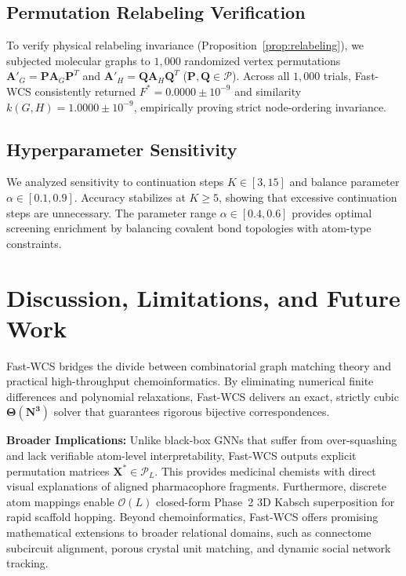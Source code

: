 \documentclass[conference]{IEEEtran}
\begin{document}
\subsection{Permutation Relabeling Verification}

To verify physical relabeling invariance (Proposition~\ref{prop:relabeling}), we subjected molecular graphs to $1,000$ randomized vertex permutations $\mathbf{A}'_G = \mathbf{P}\mathbf{A}_G\mathbf{P}^T$ and $\mathbf{A}'_H = \mathbf{Q}\mathbf{A}_H\mathbf{Q}^T$ ($\mathbf{P}, \mathbf{Q} \in \mathcal{P}$). Across all $1,000$ trials, Fast-WCS consistently returned $F^* = 0.0000 \pm 10^{-9}$ and similarity $k(G, H) = 1.0000 \pm 10^{-9}$, empirically proving strict node-ordering invariance.

\subsection{Hyperparameter Sensitivity}

We analyzed sensitivity to continuation steps $K \in [3, 15]$ and balance parameter $\alpha \in [0.1, 0.9]$. Accuracy stabilizes at $K \geq 5$, showing that excessive continuation steps are unnecessary. The parameter range $\alpha \in [0.4, 0.6]$ provides optimal screening enrichment by balancing covalent bond topologies with atom-type constraints.


\section{Discussion, Limitations, and Future Work}
\label{sec:discussion}

Fast-WCS bridges the divide between combinatorial graph matching theory and practical high-throughput chemoinformatics. By eliminating numerical finite differences and polynomial relaxations, Fast-WCS delivers an exact, strictly cubic $\mathbf{\Theta(N^3)}$ solver that guarantees rigorous bijective correspondences.

\noindent\textbf{Broader Implications:} Unlike black-box GNNs that suffer from over-squashing and lack verifiable atom-level interpretability, Fast-WCS outputs explicit permutation matrices $\mathbf{X}^* \in \mathcal{P}_L$. This provides medicinal chemists with direct visual explanations of aligned pharmacophore fragments. Furthermore, discrete atom mappings enable $\mathcal{O}(L)$ closed-form Phase~2 3D Kabsch superposition for rapid scaffold hopping. Beyond chemoinformatics, Fast-WCS offers promising mathematical extensions to broader relational domains, such as connectome subcircuit alignment, porous crystal unit matching, and dynamic social network tracking.
\end{document}
